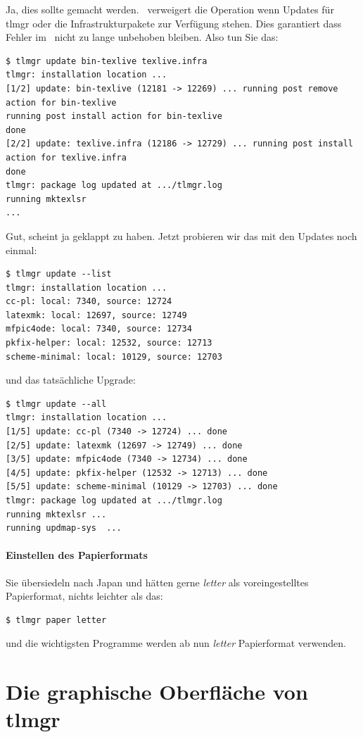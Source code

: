 Ja, dies sollte gemacht werden. \tlmgr\ verweigert die Operation wenn
Updates für tlmgr oder die Infrastrukturpakete zur Verfügung stehen.
Dies garantiert dass Fehler im \tlmgr\ nicht zu lange unbehoben bleiben.
Also tun Sie das:
\begin{lstlisting}
$ tlmgr update bin-texlive texlive.infra
tlmgr: installation location ...
[1/2] update: bin-texlive (12181 -> 12269) ... running post remove action for bin-texlive
running post install action for bin-texlive
done
[2/2] update: texlive.infra (12186 -> 12729) ... running post install action for texlive.infra
done
tlmgr: package log updated at .../tlmgr.log
running mktexlsr
...
\end{lstlisting}
Gut, scheint ja geklappt zu haben. Jetzt probieren wir das mit den 
Updates noch einmal:
\begin{lstlisting}
$ tlmgr update --list
tlmgr: installation location ...
cc-pl: local: 7340, source: 12724
latexmk: local: 12697, source: 12749
mfpic4ode: local: 7340, source: 12734
pkfix-helper: local: 12532, source: 12713
scheme-minimal: local: 10129, source: 12703
\end{lstlisting}
und das tatsächliche Upgrade:
\begin{lstlisting}
$ tlmgr update --all
tlmgr: installation location ...
[1/5] update: cc-pl (7340 -> 12724) ... done
[2/5] update: latexmk (12697 -> 12749) ... done
[3/5] update: mfpic4ode (7340 -> 12734) ... done
[4/5] update: pkfix-helper (12532 -> 12713) ... done
[5/5] update: scheme-minimal (10129 -> 12703) ... done
tlmgr: package log updated at .../tlmgr.log
running mktexlsr ...
running updmap-sys  ...
\end{lstlisting}

\paragraph{Einstellen des Papierformats}

Sie übersiedeln nach Japan und hätten gerne \emph{letter} als
voreingestelltes Papierformat, nichts leichter als das:
\begin{lstlisting}
$ tlmgr paper letter
\end{lstlisting}
und die wichtigsten Programme werden ab nun \emph{letter} Papierformat
verwenden.

\section{Die graphische Oberfläche von tlmgr}

